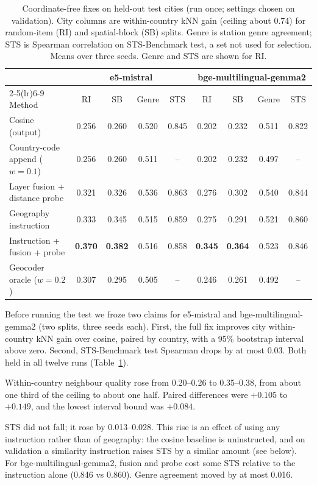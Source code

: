 \begin{table}[t]
\centering
\footnotesize
\setlength{\tabcolsep}{3.5pt}
\caption{Coordinate-free fixes on held-out test cities (run once; settings chosen on validation). City columns are within-country kNN gain (ceiling about 0.74) for random-item (RI) and spatial-block (SB) splits. Genre is station genre agreement; STS is Spearman correlation on STS-Benchmark test, a set not used for selection. Means over three seeds. Genre and STS are shown for RI.}
\label{tab:fixes}
\begin{tabular}{@{}lcccccccc@{}}
\toprule
& \multicolumn{4}{c}{e5-mistral} & \multicolumn{4}{c}{bge-multilingual-gemma2} \\
\cmidrule(lr){2-5}\cmidrule(lr){6-9}
Method & RI & SB & Genre & STS & RI & SB & Genre & STS \\
\midrule
Cosine (output) & 0.256 & 0.260 & 0.520 & 0.845 & 0.202 & 0.232 & 0.511 & 0.822 \\
Country-code append ($w=0.1$) & 0.256 & 0.260 & 0.511 & -- & 0.202 & 0.232 & 0.497 & -- \\
Layer fusion + distance probe & 0.321 & 0.326 & 0.536 & 0.863 & 0.276 & 0.302 & 0.540 & 0.844 \\
Geography instruction & 0.333 & 0.345 & 0.515 & 0.859 & 0.275 & 0.291 & 0.521 & 0.860 \\
Instruction + fusion + probe & \textbf{0.370} & \textbf{0.382} & 0.516 & 0.858 & \textbf{0.345} & \textbf{0.364} & 0.523 & 0.846 \\
\midrule
Geocoder oracle ($w=0.2$) & 0.307 & 0.295 & 0.505 & -- & 0.246 & 0.261 & 0.492 & -- \\
\bottomrule
\end{tabular}
\end{table}

Before running the test we froze two claims for e5-mistral and bge-multilingual-gemma2 (two splits, three seeds each). First, the full fix improves city within-country kNN gain over cosine, paired by country, with a 95\% bootstrap interval above zero. Second, STS-Benchmark test Spearman drops by at most 0.03. Both held in all twelve runs (Table~\ref{tab:fixes}).

Within-country neighbour quality rose from 0.20--0.26 to 0.35--0.38, from about one third of the ceiling to about one half. Paired differences were $+0.105$ to $+0.149$, and the lowest interval bound was $+0.084$.

STS did not fall; it rose by 0.013--0.028. This rise is an effect of using any instruction rather than of geography: the cosine baseline is uninstructed, and on validation a similarity instruction raises STS by a similar amount (see below). For bge-multilingual-gemma2, fusion and probe cost some STS relative to the instruction alone (0.846 vs 0.860). Genre agreement moved by at most 0.016.

